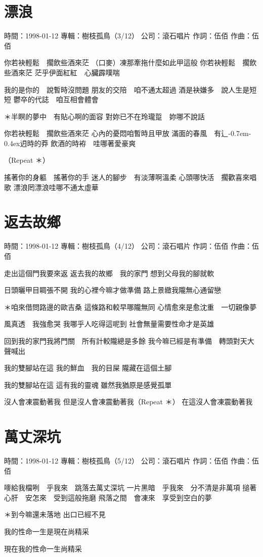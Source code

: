 \documentclass[UTF8,a4paper,oneside,twocolumn,12pt]{ctexbook}
\newcommand{\infopair}[2]{\textbullet #1：#2}
\newcommand{\zc}[1][伍佰]{\infopair{作詞}{#1}}
\newcommand{\zq}[1][伍佰]{\infopair{作曲}{#1}}
\newcommand{\zj}[1]{\infopair{專輯}{#1}}
\newcommand{\sj}[1]{\infopair{時間}{#1}}
\newcommand{\gs}[1]{\infopair{公司}{#1}}
\newcommand{\tshittho}{\hbox{辶\kern-0.7em\lower-0.4ex\hbox{\scalebox{0.7}{日}}}迌}
\newenvironment{info}{\begin{flushleft}\kaishu
	}
	{\end{flushleft}\normalsize\yahei\par}
\newenvironment{lyric}{
	}
{}
\begin{document}
\section{漂浪}
\begin{info}
	\sj{1998-01-12}
	\zj{樹枝孤鳥（3/12）}
	\gs{滾石唱片}
	\zc
	\zq
\end{info}
\begin{lyric}
	你若袂輕鬆　擱飲些酒來茫
	（口麥）凍那牽拖什麼如此甲這般
	你若袂輕鬆　擱飲些酒來茫
	茫乎伊面紅紅　心臟霹噗喘

	我的是你的　說暫時沒問題
	朋友的交陪　咱不通太超過
	酒是袂嫌多　說人生是短短
	鬱卒的代誌　咱互相會體會

	＊半瞑的夢中　有貼心啊的面容
	對妳已不在玲瓏踅　妳哪不說話

	你若袂輕鬆　擱飲些酒來茫
	心內的憂悶咱暫時且甲放
	滿面的春風　有\tshittho{}時的莽
	飲酒的時袸　哇哪著愛豪爽

	（Repeat ＊）

	搖著你的身軀　搖著你的手
	迷人的腳步　有淡薄啊溫柔
	心頭哪快活　擱歡喜來唱歌
	漂浪罔漂浪哇哪不通太虛華
\end{lyric}

\section{返去故鄉}
\begin{info}
	\sj{1998-01-12}
	\zj{樹枝孤鳥（4/12）}
	\gs{滾石唱片}
	\zc
	\zq
\end{info}
\begin{lyric}
	走出這個門我要來返 返去我的故鄉　我的家門
	想到父母我的腳就軟

	日頭曬甲目睭張不開 我的心裡今嘛才做準備
	路上景緻我隴無心通留戀

	＊咱來借問路邊的歐吉桑 這條路和較早哪隴無同
	心情愈來是愈沈重　一切親像夢

	風真透　我強愈哭 我哪乎人吃得這呢到
	社會無量需要性命才是英雄

	回到我的家門我將門關　所有計較隴總是多餘
	我今嘛已經是有準備　轉頭對天大聲喊出

	我的雙腳站在這 我的鮮血　我的目屎
	隴藏在這個土腳

	我的雙腳站在這 這有我的靈魂
	雖然我猶原是感覺孤單

	沒人會凍震動著我
	但是沒人會凍震動著我（Repeat ＊）
	在這沒人會凍震動著我
\end{lyric}

\section{萬丈深坑}
\begin{info}
	\sj{1998-01-12}
	\zj{樹枝孤鳥（5/12）}
	\gs{滾石唱片}
	\zc
	\zq
\end{info}
\begin{lyric}
	嘜給我檔咧　乎我來　跳落去萬丈深坑
	一片黑暗　乎我來　分不清是非萬項
	搥著心肝　安怎來　受到這般拖磨
	飛落之間　會凍來　享受到空白的夢

	＊到今嘛還未落地
	出口已經不見

	我的性命一生是現在尚精采

	現在我的性命一生尚精采
\end{lyric}
\end{document}
